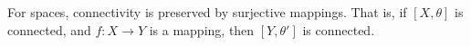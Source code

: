 For spaces, connectivity is preserved by surjective mappings. That is, if $[X, \theta]$ is connected, and $f: X \rightarrow Y$ is a mapping, then $[Y, \theta']$ is connected.
